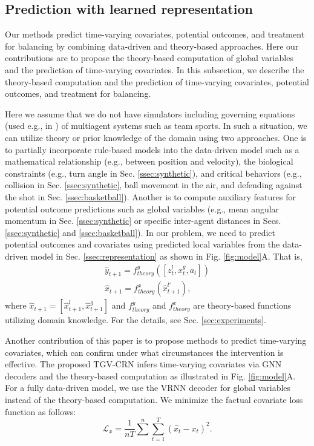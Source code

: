 \documentclass[journal]{IEEEtran}
\newcommand{\model}{{TGV-CRN}\xspace}
\newcommand{\eq}[1]{\begin{align}#1\end{align}}
\begin{document}
\subsection{Prediction with learned representation}
Our methods predict time-varying covariates, potential outcomes, and treatment for balancing by combining data-driven and theory-based approaches.
Here our contributions are to propose the theory-based computation of global variables and the prediction of time-varying covariates.
In this subsection, we describe the theory-based computation and the prediction of time-varying covariates, potential outcomes, and treatment for balancing.

Here we assume that we do not have simulators including governing equations (used e.g., in  \cite{Kipf18,takeishi2021physics}) of multiagent systems such as team sports.  
In such a situation, we can utilize theory or prior knowledge of the domain using two approaches. 
One is to partially incorporate rule-based models into the data-driven model such as a mathematical relationship \cite{Fujii20policy} (e.g., between position and velocity), the biological constraints (e.g., turn angle in Sec. \ref{ssec:synthetic}), and critical behaviors (e.g., collision in Sec. \ref{ssec:synthetic}, ball movement in the air, and defending against the shot in Sec. \ref{ssec:basketball}).
Another is to compute auxiliary features for potential outcome predictions such as global variables (e.g., mean angular momentum in Sec. \ref{ssec:synthetic} or specific inter-agent distances in Secs. \ref{ssec:synthetic} and \ref{ssec:basketball}).
In our problem, we need to predict potential outcomes and covariates using predicted local variables from the data-driven model in Sec. \ref{ssec:representation} as shown in Fig. \ref{fig:model}A.
That is, 
\eq{\hat{y}_{t+1} = f^y_{theory}([z^l_t,x^g_t,a_t])\label{eq:theoryy}\\
\hat{x}_{t+1} = f^x_{theory}(\hat{x}^{l'}_{t+1}),\label{eq:theoryx}
}
where $\hat{x}_{t+1} = [\hat{x}^l_{t+1},\hat{x}^g_{t+1}]$ and $f^y_{theory}$ and $f^x_{theory}$ are theory-based functions utilizing domain knowledge. 
For the details, see Sec. \ref{sec:experiments}.

Another contribution of this paper is to propose methods to predict time-varying covariates, which can confirm under what circumstances the intervention is effective.
The proposed \model infers time-varying covariates via GNN decoders and the theory-based computation as illustrated in Fig. \ref{fig:model}A.
For a fully data-driven model, we use the VRNN decoder for global variables instead of the theory-based computation.
We minimize the factual covariate loss function as follows:
\begin{equation}
\label{eq:covariate_loss}
    \mathcal{L}_x=\frac{1}{nT}\sum^{n}\sum_{t=1}^{T}(\hat{x}_{t}-x_{t})^{2}.
\end{equation}
\end{document}
